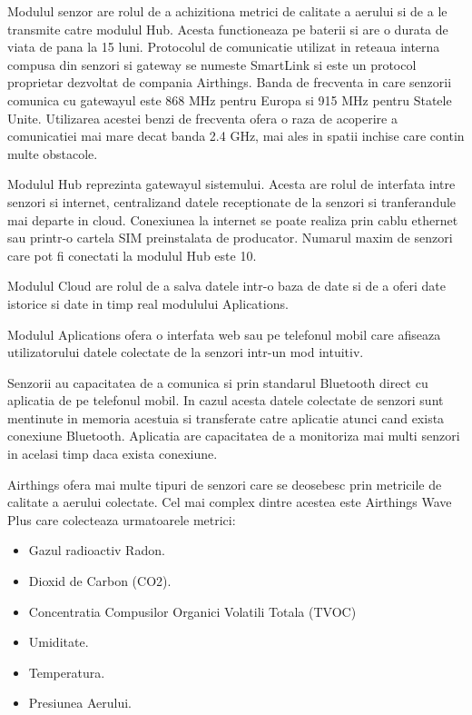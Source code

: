 Modulul senzor are rolul de a achizitiona metrici de calitate a aerului si de a le transmite catre modulul Hub. Acesta functioneaza pe baterii si are o durata de 
viata de pana la 15 luni. Protocolul de comunicatie utilizat in reteaua interna compusa din senzori si gateway se numeste SmartLink si este un protocol proprietar 
dezvoltat de compania Airthings. Banda de frecventa in care senzorii comunica cu gatewayul este 868 MHz pentru Europa si 915 MHz pentru Statele Unite. Utilizarea 
acestei benzi de frecventa ofera o raza de acoperire a comunicatiei mai mare decat banda 2.4 GHz, mai ales in spatii inchise care contin multe obstacole.

Modulul Hub reprezinta gatewayul sistemului. Acesta are rolul de interfata intre senzori si internet, centralizand datele receptionate de la senzori si tranferandule 
mai departe in cloud. Conexiunea la internet se poate realiza prin cablu ethernet sau printr-o cartela SIM preinstalata de producator. Numarul maxim de senzori care 
pot fi conectati la modulul Hub este 10.

Modulul Cloud are rolul de a salva datele intr-o baza de date si de a oferi date istorice si date in timp real modulului Aplications.

Modulul Aplications ofera o interfata web sau pe telefonul mobil care afiseaza utilizatorului datele colectate de la senzori intr-un mod intuitiv.

Senzorii au capacitatea de a comunica si prin standarul Bluetooth direct cu aplicatia de pe telefonul mobil. In cazul acesta datele colectate de senzori sunt 
mentinute in memoria acestuia si transferate catre aplicatie atunci cand exista conexiune Bluetooth. Aplicatia are capacitatea de a monitoriza mai multi senzori 
in acelasi timp daca exista conexiune.

Airthings ofera mai multe tipuri de senzori care se deosebesc prin metricile de calitate a aerului colectate. Cel mai complex dintre acestea este Airthings Wave 
Plus care colecteaza urmatoarele metrici:
\begin{itemize}
	\item Gazul radioactiv Radon.
	\item Dioxid de Carbon (CO2).
	\item Concentratia Compusilor Organici Volatili Totala (TVOC)
	\item Umiditate.
	\item Temperatura.
	\item Presiunea Aerului.
\end{itemize}

